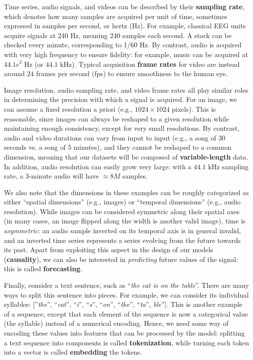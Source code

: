 Time series, audio signals, and videos can be described by their \textbf{sampling rate}, which denotes how many samples are acquired per unit of time, sometimes expressed in samples per second, or hertz (Hz). For example, classical EEG units acquire signals at 240 Hz, meaning 240 samples each second. A stock can be checked every minute, corresponding to 1/60 Hz. By contrast, audio is acquired with very high frequency to ensure fidelity: for example, music can be acquired at $44.1e^3$ Hz (or $44.1$ kHz). Typical acquisition \textbf{frame rates} for video are instead around $24$ frames per second (fps) to ensure smoothness to the human eye.

Image resolution, audio sampling rate, and video frame rates all play similar roles in determining the precision with which a signal is acquired. For an image, we can assume a fixed resolution a priori (e.g., $1024 \times 1024$ pixels). This is reasonable, since images can always be reshaped to a given resolution while maintaining enough consistency, except for very small resolutions. By contrast, audio and video durations can vary from input to input (e.g., a song of 30 seconds vs. a song of 5 minutes), and they cannot be reshaped to a common dimension, meaning that our datasets will be composed of \textbf{variable-length} data. In addition, audio resolution can easily grow very large: with a $44.1$ kHz sampling rate, a $3$-minute audio will have $\approx 8M$ samples.

We also note that the dimensions in these examples can be roughly categorized as either “spatial dimensions” (e.g., images) or “temporal dimensions” (e.g., audio resolution). While images can be considered symmetric along their spatial axes (in many cases, an image flipped along the width is another valid image), time is \textit{asymmetric}: an audio sample inverted on its temporal axis is in general invalid, and an inverted time series represents a series evolving from the future towards its past. Apart from exploiting this aspect in the design of our models (\textbf{causality}), we can also be interested in \textit{predicting} future values of the signal: this is called \textbf{forecasting}.

Finally, consider a text sentence, such as “\textit{the cat is on the table}”. There are many ways to split this sentence into pieces. For example, we can consider its individual syllables: [”\textit{the}”, “\textit{cat}”, “\textit{i}”, “\textit{s}”, “\textit{on}”, “\textit{the}”, “\textit{ta}”, \textit{ble}”]. This is another example of a sequence, except that each element of the sequence is now a categorical value (the syllable) instead of a numerical encoding. Hence, we need some way of encoding these values into features that can be processed by the model: splitting a text sequence into components is called \textbf{tokenization}, while turning each token into a vector is called \textbf{embedding} the tokens.

